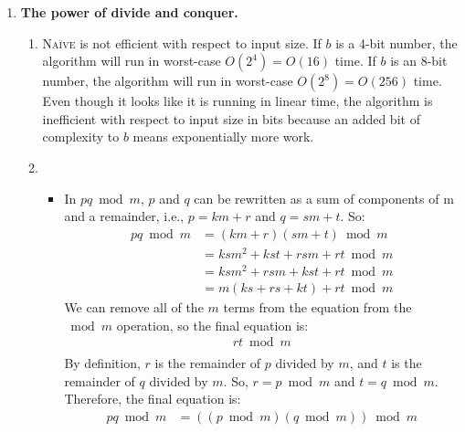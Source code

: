 \documentclass{article}
\begin{document}
\begin{enumerate}
    \item \textbf{The power of divide and conquer.} \\
    \begin{enumerate}
        \item \textsc{Na\"\i ve} is not efficient with respect to input size. If $b$ is a 4-bit number, the algorithm will run in worst-case $O(2^4) = O(16)$ time. If $b$ is an 8-bit number, the algorithm will run in worst-case $O(2^8) = O(256)$ time. Even though it looks like it is running in linear time, the algorithm is inefficient with respect to input size in bits because an added bit of complexity to $b$ means exponentially more work.\\
        \pagebreak
        \item \begin{itemize}
            \item In $pq\bmod m$, $p$ and $q$ can be rewritten as a sum of components of m and a remainder, i.e., $p=km+r$ and $q=sm+t$. So:\\
            \begin{align*}
                pq\bmod m &= (km+r)(sm+t)\bmod m \\
                &= ksm^2 + kst + rsm + rt \bmod m \\
                &= ksm^2 + rsm + kst + rt \bmod m \\
                &= m(ks + rs + kt) + rt \bmod m
            \end{align*}
            We can remove all of the $m$ terms from the equation from the $\bmod m$ operation, so the final equation is:
            \begin{align*}
                rt \bmod m \\
            \end{align*} 
            By definition, $r$ is the remainder of $p$ divided by $m$, and $t$ is the remainder of $q$ divided by $m$. So, $r=p\bmod m$ and $t=q\bmod m$. Therefore, the final equation is:
            \begin{align*}
                pq\bmod m &= ((p\bmod m)(q\bmod m))\bmod m
            \end{align*}


\end{itemize}
\end{enumerate}
\end{enumerate}
\end{document}
